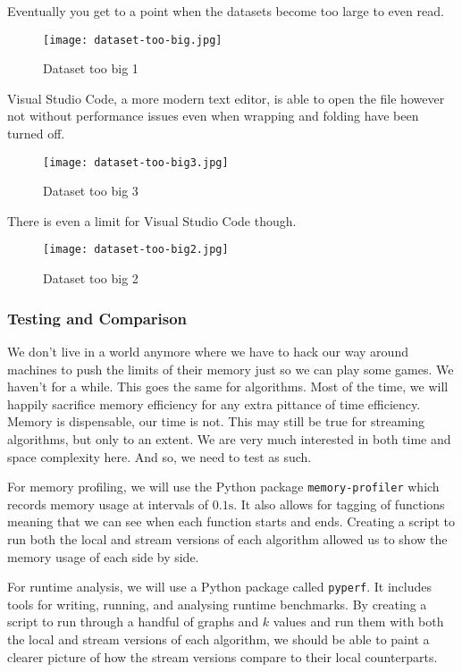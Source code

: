 Eventually you get to a point when the datasets become too large to even
read.

\begin{figure}[htb]
    \centering
    \texttt{[image: dataset-too-big.jpg]}
    \caption{Dataset too big 1}
\end{figure}

Visual Studio Code, a more modern text editor, is able to open the file
however not without performance issues even when wrapping and folding
have been turned off.

\begin{figure}[htb]
    \centering
    \texttt{[image: dataset-too-big3.jpg]}
    \caption{Dataset too big 3}
\end{figure}

There is even a limit for Visual Studio Code though.

\begin{figure}[htb]
    \centering
    \texttt{[image: dataset-too-big2.jpg]}
    \caption{Dataset too big 2}
\end{figure}

\subsubsection{Testing and Comparison}

We don't live in a world anymore where we have to hack our way around
machines to push the limits of their memory just so we can play some
games. We haven't for a while. This goes the same for algorithms. Most
of the time, we will happily sacrifice memory efficiency for any extra
pittance of time efficiency. Memory is dispensable, our time is not.
This may still be true for streaming algorithms, but only to an extent.
We are very much interested in both time and space complexity here. And
so, we need to test as such.

For memory profiling, we will use the Python package
\texttt{memory-profiler} which records memory usage at intervals of
\(0.1\text{s}\). It also allows for tagging of functions meaning that we
can see when each function starts and ends. Creating a script to run
both the local and stream versions of each algorithm allowed us to show
the memory usage of each side by side.

For runtime analysis, we will use a Python package called
\texttt{pyperf}. It includes tools for writing, running, and analysing
runtime benchmarks. By creating a script to run through a handful of
graphs and \(k\) values and run them with both the local and stream
versions of each algorithm, we should be able to paint a clearer picture
of how the stream versions compare to their local counterparts.

